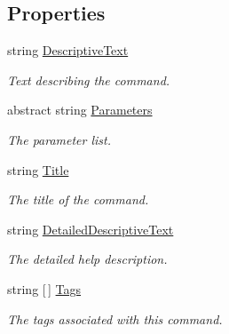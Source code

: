 \subsection*{Properties}
\begin{DoxyCompactItemize}
\item 
string \hyperlink{class_developer_console_1_1_core_1_1_command_base_a30914c228150fccb56aba06ce78d0b80}{Descriptive\+Text}
\begin{DoxyCompactList}\small\item\em Text describing the command. \end{DoxyCompactList}\item 
abstract string \hyperlink{class_developer_console_1_1_core_1_1_command_base_aa7802f7a4d1c16b466ce471cfd753c19}{Parameters}
\begin{DoxyCompactList}\small\item\em The parameter list. \end{DoxyCompactList}\item 
string \hyperlink{class_developer_console_1_1_core_1_1_command_base_a99d78a8c39ff47e8f29c699570e2dc2e}{Title}
\begin{DoxyCompactList}\small\item\em The title of the command. \end{DoxyCompactList}\item 
string \hyperlink{class_developer_console_1_1_core_1_1_command_base_ad388f0c50319867b5ab17446ba978148}{Detailed\+Descriptive\+Text}
\begin{DoxyCompactList}\small\item\em The detailed help description. \end{DoxyCompactList}\item 
string \mbox{[}$\,$\mbox{]} \hyperlink{class_developer_console_1_1_core_1_1_command_base_a6aaea49008e5b985da4690901173cb0b}{Tags}
\begin{DoxyCompactList}\small\item\em The tags associated with this command. \end{DoxyCompactList}\item 

\end{DoxyCompactItemize}
